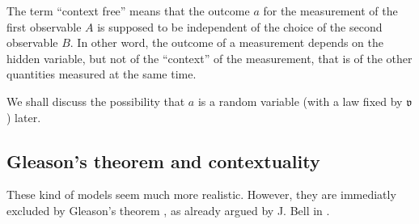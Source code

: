 The term ``context free'' means that the outcome $a$ for the measurement of the first  observable $A$  is supposed to be independent of the choice of the second observable  $B$. 
In other word, the outcome of a measurement depends on the hidden variable, but not of the ``context'' of the measurement, that is of the other  quantities measured at the same time.

We shall discuss the possibility that $a$ is a random variable (with a law fixed by $\mathfrak{v}$) later.

\subsection{Gleason's theorem and contextuality}
\label{ssGTCont}
These kind of models seem much more realistic. 
However, they are immediatly excluded by  Gleason's theorem \cite{Gleason57}, as already argued by J. Bell in \cite{RevModPhys.38.447}.

